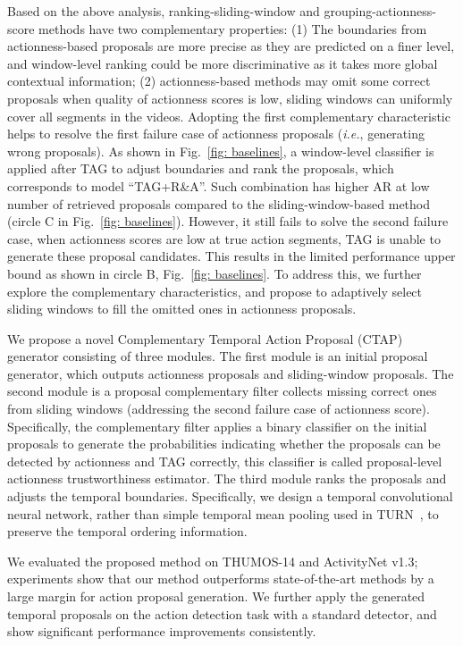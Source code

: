 \documentclass[runningheads]{llncs}
\begin{document}
Based on the above analysis, ranking-sliding-window and grouping-actionness-score methods have two complementary properties: 
(1) The boundaries from actionness-based proposals are more precise as they are predicted on a finer level, and window-level ranking could be more discriminative as it takes more global contextual information; (2) actionness-based methods may omit some correct proposals when quality of actionness scores is low, sliding windows can uniformly cover all segments in the videos. 
Adopting the first complementary characteristic helps to resolve the first failure case of actionness proposals (\emph{i.e.}, generating wrong proposals). As shown in Fig.~\ref{fig: baselines}, a window-level classifier is applied after TAG to adjust boundaries and rank the proposals, which corresponds to model ``TAG+R\&A''.  Such combination has higher AR at low number of retrieved proposals compared to the sliding-window-based method (circle C in Fig.~\ref{fig: baselines}). However, it still fails to solve the second failure case, when actionness scores are low at true action segments, TAG is unable to generate these proposal candidates.
This results in the limited performance upper bound as shown in circle B, Fig.~\ref{fig: baselines}. 
To address this, we further explore the complementary characteristics, and propose to adaptively select sliding windows to fill the omitted ones in actionness proposals.

We propose a novel Complementary Temporal Action Proposal (CTAP) generator consisting of three modules. 
The first module is an initial proposal generator, which outputs actionness proposals and sliding-window proposals. 
The second module is a proposal complementary filter collects missing correct ones from sliding windows (addressing the second failure case of actionness score). Specifically, the complementary filter applies a binary classifier on the initial proposals to generate the probabilities indicating whether the proposals can be detected by actionness and TAG correctly, this classifier is called proposal-level actionness trustworthiness estimator.
The third module ranks the proposals and adjusts the temporal boundaries. Specifically, we design a temporal convolutional neural network, rather than simple temporal mean pooling used in TURN~\cite{Gao_2017_ICCV}, to preserve the temporal ordering information. 

We evaluated the proposed method on THUMOS-14 and ActivityNet v1.3; experiments show that our method outperforms state-of-the-art methods by a large margin for action proposal generation. 
We further apply the generated temporal proposals on the action detection task with a standard detector, and show significant performance improvements consistently. 
\end{document}
